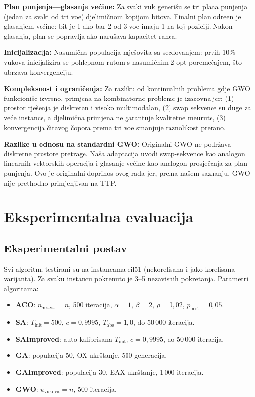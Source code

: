 \documentclass[12pt,a4paper]{article}
\begin{document}
\textbf{Plan punjenja---glasanje ve\'{c}ine:}
Za svaki vuk generi\v{s}u se tri plana punjenja (jedan za svaki od tri vo\dj{}e) djelimi\v{c}nom kopijom bitova. Finalni plan odre\dj{}en je glasanjem ve\'{c}ine: bit je 1 ako bar 2 od 3 vo\dj{}e imaju 1 na toj poziciji. Nakon glasanja, plan se popravlja ako narušava kapacitet ranca.

\textbf{Inicijalizacija:}
Nasumi\v{c}na populacija mje\v{s}ovita sa seedovanjem: prvih 10\% vukova inicijalizira se pohlepnom rutom s nasumi\v{c}nim 2-opt poreme\'{c}ajem, \v{s}to ubrzava konvergenciju.

\textbf{Kompleksnost i ograničenja:}
Za razliku od kontinualnih problema gdje GWO funkcioniše izvrsno, primjena na kombinatorne probleme je izazovna jer:
(1) prostor rje\v{s}enja je diskretan i visoko multimodalan,
(2) swap sekvence su duge za ve\'{c}e instance, a djelimi\v{c}na primjena ne garantuje kvalitetne me\dj{}urute,
(3) konvergencija \v{c}itavog \v{c}opora prema tri vo\dj{}e smanjuje raznolikost prerano.

\textbf{Razlike u odnosu na standardni GWO:} Originalni GWO ne podr\v{z}ava diskretne prostore pretrage. Na\v{s}a adaptacija uvodi swap-sekvence kao analogon linearnih vektorskih operacija i glasanje ve\'{c}ine kao analogon prosje\v{c}enja za plan punjenja. Ovo je originalni doprinos ovog rada jer, prema na\v{s}em saznanju, GWO nije prethodno primjenjivan na TTP.

\section{Eksperimentalna evaluacija}

\subsection{Eksperimentalni postav}

Svi algoritmi testirani su na instancama eil51 (nekorelisana i jako korelisana varijanta). Za svaku instancu pokrenuto je 3--5 nezavisnih pokretanja. Parametri algoritama:
\begin{itemize}
    \item \textbf{ACO}: $n_{\text{mrava}} = n$, 500 iteracija, $\alpha=1$, $\beta=2$, $\rho=0{,}02$, $p_{\text{best}}=0{,}05$.
    \item \textbf{SA}: $T_{\text{init}} = 500$, $c = 0{,}9995$, $T_{\text{abs}} = 1{,}0$, do 50\,000 iteracija.
    \item \textbf{SAImproved}: auto-kalibrisana $T_{\text{init}}$, $c = 0{,}9995$, do 50\,000 iteracija.
    \item \textbf{GA}: populacija 50, OX ukrštanje, 500 generacija.
    \item \textbf{GAImproved}: populacija 30, EAX ukrštanje, 1\,000 iteracija.
    \item \textbf{GWO}: $n_{\text{vukova}} = n$, 500 iteracija.
\end{itemize}
\end{document}
